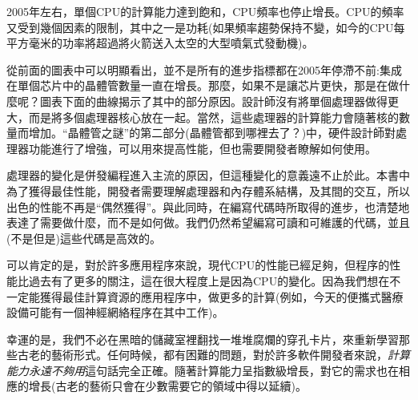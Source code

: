2005年左右，單個CPU的計算能力達到飽和，CPU頻率也停止增長。CPU的頻率又受到幾個因素的限制，其中之一是功耗(如果頻率趨勢保持不變，如今的CPU每平方毫米的功率將超過將火箭送入太空的大型噴氣式發動機)。

從前面的圖表中可以明顯看出，並不是所有的進步指標都在2005年停滯不前:集成在單個芯片中的晶體管數量一直在增長。那麼，如果不是讓芯片更快，那是在做什麼呢？圖表下面的曲線揭示了其中的部分原因。設計師沒有將單個處理器做得更大，而是將多個處理器核心放在一起。當然，這些處理器的計算能力會隨著核的數量而增加。“晶體管之謎”的第二部分(晶體管都到哪裡去了？)中，硬件設計師對處理器功能進行了增強，可以用來提高性能，但也需要開發者瞭解如何使用。

處理器的變化是併發編程進入主流的原因，但這種變化的意義遠不止於此。本書中為了獲得最佳性能，開發者需要理解處理器和內存體系結構，及其間的交互，所以出色的性能不再是“偶然獲得”。與此同時，在編寫代碼時所取得的進步，也清楚地表達了需要做什麼，而不是如何做。我們仍然希望編寫可讀和可維護的代碼，並且(不是但是)這些代碼是高效的。

可以肯定的是，對於許多應用程序來說，現代CPU的性能已經足夠，但程序的性能比過去有了更多的關注，這在很大程度上是因為CPU的變化。因為我們想在不一定能獲得最佳計算資源的應用程序中，做更多的計算(例如，今天的便攜式醫療設備可能有一個神經網絡程序在其中工作)。

幸運的是，我們不必在黑暗的儲藏室裡翻找一堆堆腐爛的穿孔卡片，來重新學習那些古老的藝術形式。任何時候，都有困難的問題，對於許多軟件開發者來說，\textit{計算能力永遠不夠用}這句話完全正確。隨著計算能力呈指數級增長，對它的需求也在相應的增長(古老的藝術只會在少數需要它的領域中得以延續)。











